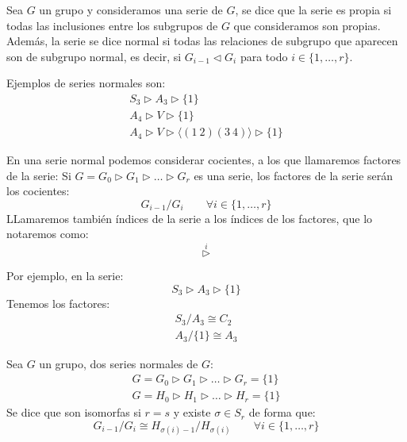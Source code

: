 \begin{definicion}
    Sea $G$ un grupo y consideramos una serie de $G$, se dice que la serie es propia si todas las inclusiones entre los subgrupos de $G$ que consideramos son propias.\\

    \noindent
    Además, la serie se dice normal si todas las relaciones de subgrupo que aparecen son de subgrupo normal, es decir, si $G_{i-1}\lhd G_i$ para todo $i \in \{1,\ldots,r\}$.
\end{definicion}

\begin{ejemplo}
    Ejemplos de series normales son:
    \begin{gather*}
        S_3 \rhd A_3 \rhd \{1\} \\
        A_4 \rhd V \rhd \{1\} \\
        A_4 \rhd V \rhd \langle (1\ 2)(3\ 4) \rangle \rhd \{1\}
    \end{gather*}
\end{ejemplo}

\begin{definicion}
    En una serie normal podemos considerar cocientes, a los que llamaremos factores de la serie:
    Si $G = G_0 \rhd G_1 \rhd \ldots \rhd G_r$ es una serie, los factores de la serie serán los cocientes:
    \begin{equation*}
        G_{i-1}/G_i \qquad \forall i \in \{1,\ldots,r\}
    \end{equation*}
    LLamaremos también índices de la serie a los índices de los factores, que lo notaremos como:
    \begin{equation*}
        \stackrel{i}{\rhd}
    \end{equation*}
\end{definicion}

\begin{ejemplo}
    Por ejemplo, en la serie:
    \begin{equation*}
        S_3 \rhd A_3 \rhd \{1\}
    \end{equation*}
    Tenemos los factores:
    \begin{gather*}
        S_3/A_3 \cong C_2 \\
        A_3/\{1\} \cong A_3
    \end{gather*}
\end{ejemplo}

\begin{definicion}
    Sea $G$ un grupo, dos series normales de $G$:
    \begin{gather*}
        G = G_0 \rhd G_1 \rhd \ldots \rhd G_r = \{1\} \\
        G = H_0 \rhd H_1 \rhd \ldots \rhd H_r = \{1\}
    \end{gather*}
    Se dice que son isomorfas si $r=s$ y existe $\sigma\in S_r$ de forma que:
    \begin{equation*}
        G_{i-1}/G_i \cong H_{\sigma(i)-1}/H_{\sigma(i)} \qquad \forall i \in \{1,\ldots,r\}
    \end{equation*}
\end{definicion}


